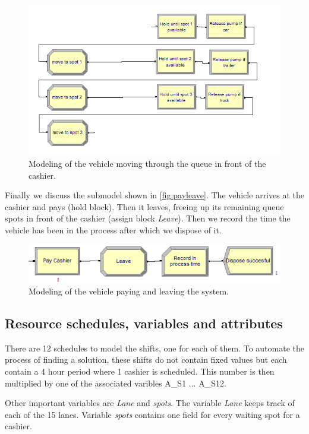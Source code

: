 \begin{figure}[h!]
\begin{center}
	\includegraphics[scale=0.8]{images/model-description/cashier-queue.PNG}
	\caption{Modeling of the vehicle moving through the queue in front of the cashier.}
	\label{fig:cashierqueue}
\end{center}
\end{figure}

Finally we discuss the submodel shown in \autoref{fig:payleave}.
 The vehicle arrives at the cashier and pays (hold block). 
 Then it leaves, freeing up its remaining queue spots in front of the cashier (assign block \textit{Leave}).
 Then we record the time the vehicle has been in the process after which we dispose of it.

\begin{figure}[h!]
\begin{center}
	\includegraphics[scale=0.8]{images/model-description/pay-and-leave.PNG}
	\caption{Modeling of the vehicle paying and leaving the system.}
	\label{fig:payleave}
\end{center}
\end{figure}

\subsection{Resource schedules, variables and attributes}\label{app:resources}
There are 12 schedules to model the shifts, one for each of them.
To automate the process of finding a solution, these shifts do not contain fixed values but each contain a 4 hour period where 1 cashier is scheduled.
This number is then multiplied by one of the associated varibles A\_S1 $\ldots$ A\_S12.

Other important variables are \textit{Lane} and \textit{spots}.
The variable \textit{Lane} keeps track of each of the 15 lanes.
Variable \textit{spots} contains one field for every waiting spot for a cashier. 
